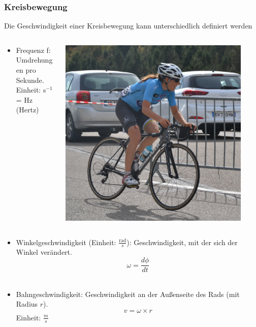 \documentclass{beamer}
\begin{document}
\begin{frame}
\frametitle{Kreisbewegung}

Die Geschwindigkeit einer Kreisbewegung kann unterschiedlich definiert werden


\begin{columns}[c]

\begin{column}{8cm}

\begin{itemize}
\item
Frequenz f: Umdrehungen pro Sekunde. \\
Einheit: s$^{-1}$ =  Hz (Hertz) \\

\end{itemize}

\end{column}

\begin{column}{3cm}
\begin{center}
\includegraphics[width=0.9\textwidth]{fahrrad.jpg}
\end{center}
\end{column}


\end{columns}




\begin{itemize}
\item
Winkelgeschwindigkeit (Einheit: \(\frac{\text{rad}}{s}\)): Geschwindigkeit, mit der sich der Winkel verändert. 
\[
\omega = \frac{d\phi}{dt} 
\]
\\
\item
Bahngeschwindigkeit: Geschwindigkeit an der Außenseite des Rads (mit Radius \(r\)). 
\[
v = \omega \times r
\]
Einheit: \(\frac{m}{s}\)
\end{itemize}


\end{frame}
\end{document}
